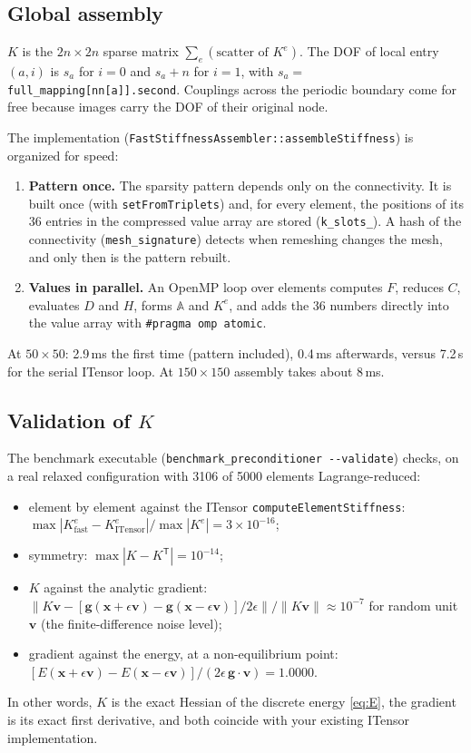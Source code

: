 \documentclass[11pt,a4paper]{article}
\theoremstyle{remark}
\newcommand{\x}{\bm{x}}
\newcommand{\g}{\bm{g}}
\newcommand{\T}{^{\mathsf T}}
\newcommand{\code}[1]{\texttt{#1}}
\begin{document}
\subsection{Global assembly}

$K$ is the $2n\times2n$ sparse matrix $\sum_e (\text{scatter of }K^e)$. The DOF of local entry
$(a,i)$ is $s_a$ for $i=0$ and $s_a+n$ for $i=1$, with $s_a=$ \code{full\_\allowbreak{}mapping[nn[a]].second}.
Couplings across the periodic boundary come for free because images carry the DOF of their
original node.

The implementation (\code{FastStiffnessAssembler::\allowbreak{}assembleStiffness}) is organized for speed:
\begin{enumerate}[leftmargin=*]
\item \textbf{Pattern once.} The sparsity pattern depends only on the connectivity. It is built
once (with \code{setFromTriplets}) and, for every element, the positions of its 36 entries in
the compressed value array are stored (\code{k\_\allowbreak{}slots\_\allowbreak{}}). A hash of the connectivity
(\code{mesh\_\allowbreak{}signature}) detects when remeshing changes the mesh, and only then is the pattern
rebuilt.
\item \textbf{Values in parallel.} An OpenMP loop over elements computes $F$, reduces $C$,
evaluates $D$ and $H$, forms $\mathbb{A}$ and $K^e$, and adds the 36 numbers directly into the
value array with \code{\#pragma omp atomic}.
\end{enumerate}
At $50\times50$: 2.9\,ms the first time (pattern included), 0.4\,ms afterwards, versus 7.2\,s for
the serial ITensor loop. At $150\times150$ assembly takes about 8\,ms.

\subsection{Validation of $K$}

The benchmark executable (\code{benchmark\_\allowbreak{}preconditioner -{}-validate}) checks, on a real relaxed
configuration with 3106 of 5000 elements Lagrange-reduced:
\begin{itemize}[leftmargin=*]
\item element by element against the ITensor \code{computeElementStiffness}:
$\max|K^e_{\text{fast}}-K^e_{\text{ITensor}}| / \max|K^e| = 3\times10^{-16}$;
\item symmetry: $\max|K-K\T| = 10^{-14}$;
\item $K$ against the analytic gradient: $\|K\bm v - [\g(\x+\epsilon\bm v)-\g(\x-\epsilon\bm v)]/2\epsilon\|/\|K\bm v\| \approx 10^{-7}$
for random unit $\bm v$ (the finite-difference noise level);
\item gradient against the energy, at a non-equilibrium point: $[E(\x+\epsilon\bm v)-E(\x-\epsilon\bm v)]/(2\epsilon\,\g\cdot\bm v) = 1.0000$.
\end{itemize}
In other words, $K$ is the exact Hessian of the discrete energy \eqref{eq:E}, the gradient is its
exact first derivative, and both coincide with your existing ITensor implementation.
\end{document}
